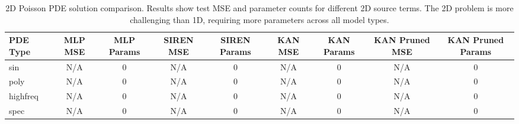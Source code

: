 \begin{table}
\caption{2D Poisson PDE solution comparison. Results show test MSE and parameter counts for different 2D source terms. The 2D problem is more challenging than 1D, requiring more parameters across all model types.}
\label{tab:pde_2d_comparison}
\begin{tabular}{|l|c|c|c|c|c|c|c|c|}
\toprule
PDE Type & MLP MSE & MLP Params & SIREN MSE & SIREN Params & KAN MSE & KAN Params & KAN Pruned MSE & KAN Pruned Params \\
\midrule
sin & N/A & 0 & N/A & 0 & N/A & 0 & N/A & 0 \\
poly & N/A & 0 & N/A & 0 & N/A & 0 & N/A & 0 \\
highfreq & N/A & 0 & N/A & 0 & N/A & 0 & N/A & 0 \\
spec & N/A & 0 & N/A & 0 & N/A & 0 & N/A & 0 \\
\bottomrule
\end{tabular}
\end{table}
